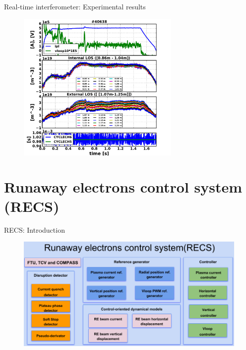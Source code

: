 \documentclass{beamer}
\begin{document}
\begin{frame}{Real-time interferometer: Experimental results}
    \begin{figure}
        \centering
        \includegraphics[width=0.7\textwidth]{inter/inter_40638.pdf}
    \end{figure}
\end{frame}





\section{Runaway electrons control system (RECS)}

\begin{frame}{RECS: Introduction}

\begin{figure}[h]
	\centering
	\includegraphics[width=1\linewidth]{Chapter3Fig/RESCframework.png}
\end{figure}
\end{frame}
\end{document}
